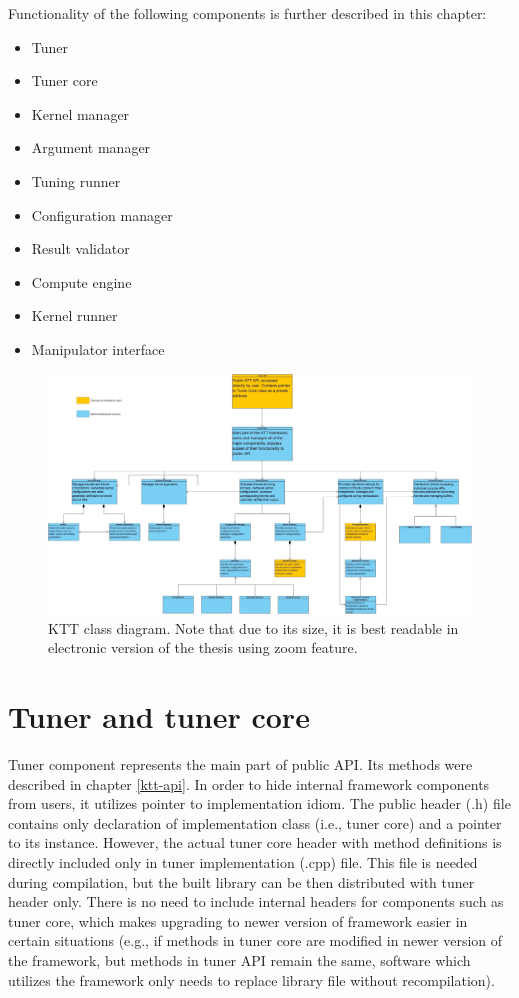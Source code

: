 \documentclass
[
    digital, %
    oneside, %
    table, %
    nolof, %
    nolot, %
    nocover %
]{fithesis3}
\begin{document}
Functionality of the following components is further described in this chapter:
\begin{itemize}
    \item Tuner
    \item Tuner core
    \item Kernel manager
    \item Argument manager
    \item Tuning runner
    \item Configuration manager
    \item Result validator
    \item Compute engine
    \item Kernel runner
    \item Manipulator interface
\end{itemize}

\begin{figure}
    \begin{adjustwidth}{-3.5cm}{-3.5cm}
        \includegraphics[width=250mm]{resources/ktt_class_diagram.jpg}
    \end{adjustwidth}
    \caption{KTT class diagram. Note that due to its size, it is best readable in electronic version of the thesis using zoom feature.}
    \label{ktt-class-diagram}
\end{figure}

\section{Tuner and tuner core}
Tuner component represents the main part of public API. Its methods were described in chapter \ref{ktt-api}. In order to hide internal framework
components from users, it utilizes pointer to implementation idiom. The public header (.h) file contains only declaration of implementation class
(i.e., tuner core) and a pointer to its instance. However, the actual tuner core header with method definitions is directly included only in tuner
implementation (.cpp) file. This file is needed during compilation, but the built library can be then distributed with tuner header only. There is
no need to include internal headers for components such as tuner core, which makes upgrading to newer version of framework easier in certain situations
(e.g., if methods in tuner core are modified in newer version of the framework, but methods in tuner API remain the same, software which utilizes the
framework only needs to replace library file without recompilation).
\end{document}
